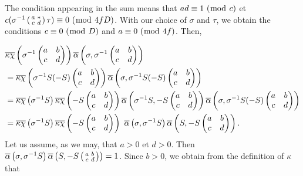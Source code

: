 \documentclass[leqno,10pt]{amsart}
\theoremstyle{plain}
\numberwithin{equation}{section}
\theoremstyle{definition}
\theoremstyle{remark}
\begin{document}
The condition appearing in the sum means that $ad \equiv 1\ (\bmod\  c)$ et $c(\sigma^{-1} \left(\begin{smallmatrix} a&*\\c&d\end{smallmatrix}\right)\tau) \equiv 0\ (\bmod\  4fD)$. With our choice of $\sigma$ and $\tau$, we obtain the conditions $c \equiv 0 \ (\bmod\  D)$ and $a\equiv 0 \ (\bmod\  4f)$. Then,

\begin{align*}
&\overline{\kappa \chi} \left( \sigma^{-1} \begin{pmatrix} a&b \\ c&d \end{pmatrix}\right) \overline{\alpha}\left(\sigma, \sigma^{-1} \begin{pmatrix} a&b \\ c&d \end{pmatrix}\right)\\
&= \overline{\kappa \chi} \left( \sigma^{-1}S (-S) \begin{pmatrix} a&b \\ c&d \end{pmatrix}\right) \overline{\alpha}\left(\sigma, \sigma^{-1}S (-S) \begin{pmatrix} a&b \\ c&d \end{pmatrix}\right)\\
&= \overline{\kappa \chi}\left( \sigma^{-1}S\right) \overline{\kappa \chi}\left(-S \begin{pmatrix} a&b \\ c&d \end{pmatrix}\right) 
\overline{\alpha}\left(\sigma^{-1}S,-S \begin{pmatrix} a&b \\ c&d \end{pmatrix} \right)
\overline{\alpha}\left(\sigma, \sigma^{-1}S (-S) \begin{pmatrix} a&b \\ c&d \end{pmatrix}\right)\\
&= \overline{\kappa \chi}\left( \sigma^{-1}S\right) \overline{\kappa \chi}\left(-S \begin{pmatrix} a&b \\ c&d \end{pmatrix}\right)\
\overline{\alpha}\left(\sigma , \sigma^{-1}S\right) \overline{\alpha}\left(S, -S \begin{pmatrix} a&b \\ c&d \end{pmatrix} \right).
\end{align*}
Let us assume, as we may, that $a>0$ et $d>0$. Then $\overline{\alpha}\left(\sigma , \sigma^{-1}S\right) \overline{\alpha}\left(S, -S \left(\begin{smallmatrix} a&b \\ c&d \end{smallmatrix}\right) \right)=1$. 
Since $b>0$, we obtain from the definition of $\kappa$ that
 
\end{document}
